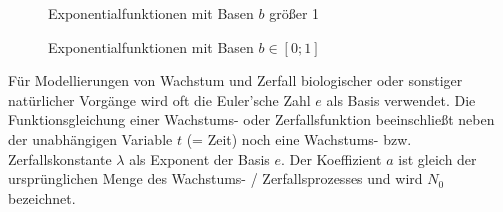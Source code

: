\pagebreak

\begin{figure}[t!]
	\begin{floatrow}
		\ffigbox
		{
		} {\caption*{Exponentialfunktionen mit Basen $b$ gr\"{o}\ss{}er 1}}

		\ffigbox
		{
		} {\caption*{Exponentialfunktionen mit Basen $b \in [0; 1]$}}
	\end{floatrow}
\end{figure}

\pagebreak

F\"{u}r Modellierungen von Wachstum und Zerfall biologischer oder sonstiger nat\"{u}rlicher Vorg\"{a}nge wird oft die Euler'sche Zahl $e$ als Basis verwendet. Die Funktionsgleichung einer Wachstums- oder Zerfallsfunktion beeinschlie\ss{}t neben der unabh\"{a}ngigen Variable $t$ (= Zeit) noch eine Wachstums- bzw. Zerfallskonstante $\lambda$ als Exponent der Basis $e$. Der Koeffizient $a$ ist gleich der urspr\"{u}nglichen Menge des Wachstums- / Zerfallsprozesses und wird $N_{0}$ bezeichnet. 

